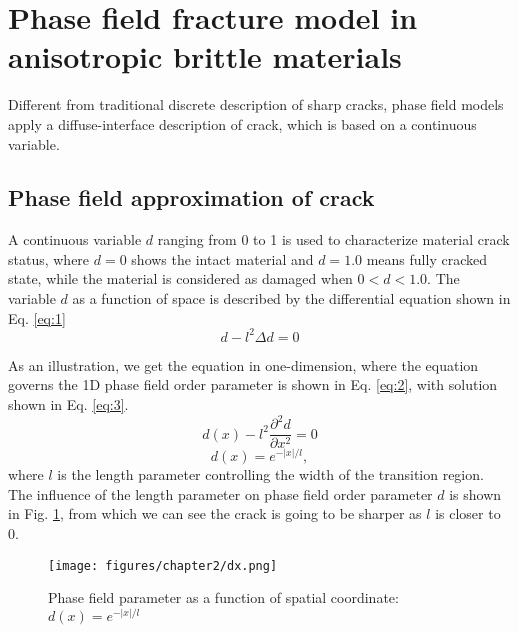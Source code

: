 \documentclass[3p,10pt,sort&compress]{elsarticle}
\begin{document}
\section{Phase field fracture model in anisotropic brittle materials}
\label{sec:phasefieldmodel}
Different from traditional discrete description of sharp cracks, phase field models apply a diffuse-interface description of crack, which is based on a continuous variable.
\subsection{Phase field approximation of crack}
\label{ssec:phasefieldcrack}
A continuous variable $d$ ranging from 0 to 1 is used to characterize material crack status, where $d = 0$ shows the intact material and $d = 1.0$ means fully cracked state, while the material is considered as damaged when $0 < d < 1.0$. The variable $d$ as a function of space is described by the differential equation shown in Eq. \ref{eq:1}
\begin{equation}\label{eq:1}
  d - l^2\Delta d = 0
\end{equation}


As an illustration, we get the equation in one-dimension, where the equation governs the 1D phase field order parameter is shown in Eq. \ref{eq:2}, with solution shown in Eq. \ref{eq:3}.
\begin{equation}\label{eq:2}
  d(x) - l^2\frac{\partial ^2d}{\partial x^2} = 0
\end{equation}
\begin{equation}\label{eq:3}
  d(x) = e^{-|x|/l},
\end{equation}
where $l$ is the length parameter controlling the width of the transition region. The influence of the length parameter on phase field order parameter $d$ is shown in Fig. \ref{fig:phasefiledparameter}, from which we can see the crack is going to be sharper as $l$ is closer to 0.
\begin{figure}[!htb]
  \begin{center}
    \texttt{[image: figures/chapter2/dx.png]}
    \caption{Phase field parameter as a function of spatial coordinate: $d(x) = e^{-|x|/l}$}
    \label{fig:phasefiledparameter}
  \end{center}
\end{figure}
\end{document}
